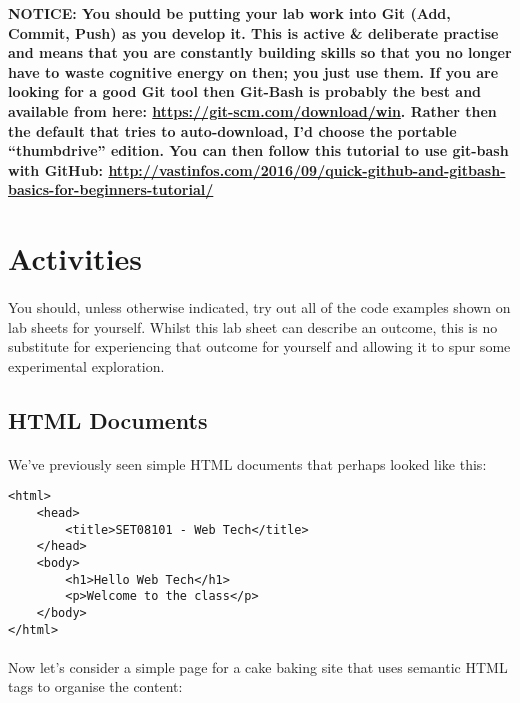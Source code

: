 \documentclass[10pt, a4paper]{article}
\begin{document}
\begin{framed}
{\bf{NOTICE:} You should be putting your lab work into Git (Add, Commit, Push) as you develop it. This is active \& deliberate practise and means that you are constantly building skills so that you no longer have to waste cognitive energy on then; you just use them. If you are looking for a good Git tool then Git-Bash is probably the best and available from here: \url{https://git-scm.com/download/win}. Rather then the default that tries to auto-download, I'd choose the portable ``thumbdrive'' edition. You can then follow this tutorial to use git-bash with GitHub: \url{http://vastinfos.com/2016/09/quick-github-and-gitbash-basics-for-beginners-tutorial/} }
\end{framed}


\section{Activities}

\paragraph{} You should, unless otherwise indicated, try out all of the code examples shown on lab sheets for yourself. Whilst this lab sheet can describe an outcome, this is no substitute for experiencing that outcome for yourself and allowing it to spur some experimental exploration.

\subsection{HTML Documents}
\paragraph{} We've previously seen simple HTML documents that perhaps looked like this:

\begin{lstlisting}
<html>
    <head>
        <title>SET08101 - Web Tech</title>
    </head>
    <body>
        <h1>Hello Web Tech</h1>
        <p>Welcome to the class</p>
    </body>
</html>
\end{lstlisting}

\paragraph{} Now let's consider a simple page for a cake baking site that uses semantic HTML tags to organise the content:
\end{document}
